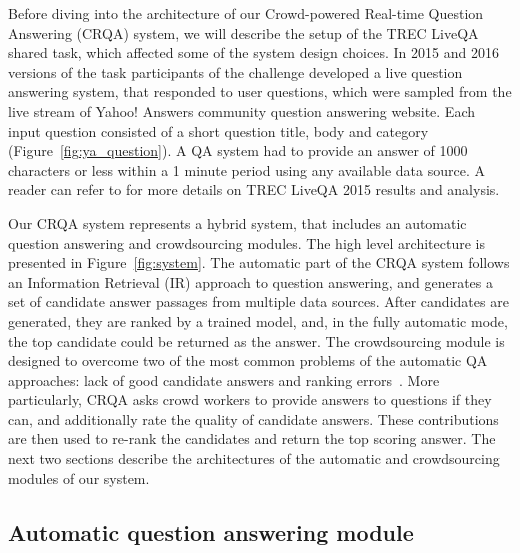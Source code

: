 \documentclass[letterpaper]{article}
\begin{document}
Before diving into the architecture of our Crowd-powered Real-time Question Answering (CRQA) system, we will describe the setup of the TREC LiveQA shared task, which affected some of the system design choices.
In 2015 and 2016 versions of the task participants of the challenge developed a live question answering system, that responded to user questions, which were sampled from the live stream of Yahoo! Answers community question answering website.
Each input question consisted of a short question title, body and category (Figure~\ref{fig:ya_question}).
A QA system had to provide an answer of 1000 characters or less within a 1 minute period using any available data source.
A reader can refer to \cite{overviewliveqa15} for more details on TREC LiveQA 2015 results and analysis.

Our CRQA system represents a hybrid system, that includes an automatic question answering and crowdsourcing modules.
The high level architecture is presented in Figure~\ref{fig:system}.
The automatic part of the CRQA system follows an Information Retrieval (IR) approach to question answering, and generates a set of candidate answer passages from multiple data sources.
After candidates are generated, they are ranked by a trained model, and, in the fully automatic mode, the top candidate could be returned as the answer.
The crowdsourcing module is designed to overcome two of the most common problems of the automatic QA approaches: lack of good candidate answers and ranking errors~\cite{moldovan2003performance,savenkov_trecliveqa15}.
More particularly, CRQA asks crowd workers to provide answers to questions if they can, and additionally rate the quality of candidate answers.
These contributions are then used to re-rank the candidates and return the top scoring answer.
The next two sections describe the architectures of the automatic and crowdsourcing modules of our system.

\subsection{Automatic question answering module}
\label{sec:system:auto}
\end{document}

